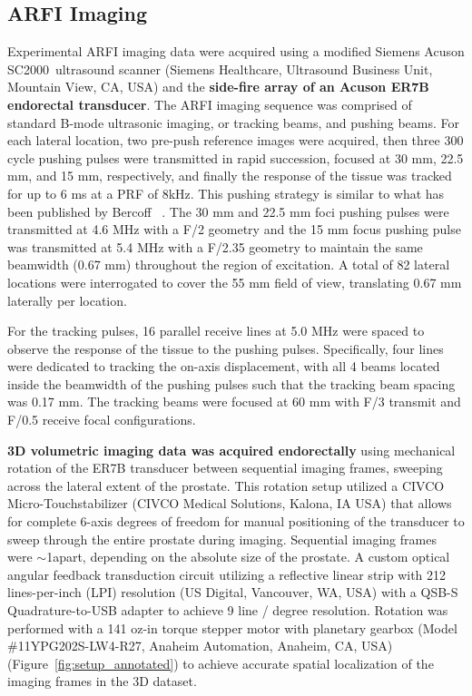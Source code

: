 \subsection{ARFI Imaging}
Experimental ARFI imaging data were acquired using a modified Siemens Acuson
SC2000\texttrademark~ultrasound scanner (Siemens Healthcare, Ultrasound Business Unit,
Mountain View, CA, USA) and the \textbf{side-fire array of an Acuson ER7B
endorectal transducer}.  The ARFI imaging sequence was comprised of
standard B-mode ultrasonic imaging, or tracking beams, and pushing beams. For
each lateral location, two pre-push reference images were acquired, then three
300 cycle pushing pulses were transmitted in rapid succession, focused at 30
mm, 22.5 mm, and 15 mm, respectively, and finally the response of the tissue
was tracked for up to 6 ms at a PRF of 8kHz. This pushing strategy is similar to
what has been published by Bercoff \etal~\cite{Bercoff2004}. The 30 mm and 22.5
mm foci pushing pulses were transmitted at 4.6 MHz with a F/2 geometry and the
15 mm focus pushing pulse was transmitted at 5.4 MHz with a F/2.35 geometry to
maintain the same beamwidth (0.67 mm) throughout the region of excitation. A
total of 82 lateral locations were interrogated to cover the 55 mm field of
view, translating 0.67 mm laterally per location.

For the tracking pulses, 16 parallel receive lines at 5.0 MHz were spaced to
observe the response of the tissue to the pushing pulses.  Specifically, four
lines were dedicated to tracking the on-axis displacement, with all 4 beams
located inside the beamwidth of the pushing pulses such that the tracking beam
spacing was 0.17 mm.  The tracking beams were focused at 60 mm with F/3
transmit and F/0.5 receive focal configurations.

\textbf{3D volumetric imaging data was acquired endorectally} using mechanical
rotation of the ER7B transducer between sequential imaging frames, sweeping
across the lateral extent of the prostate.  This rotation setup utilized a
CIVCO Micro-Touch\texttrademark stabilizer (CIVCO Medical Solutions, Kalona, IA
USA) that allows for complete 6-axis degrees of freedom for manual positioning
of the transducer to sweep through the entire prostate during imaging.
Sequential imaging frames were $\sim$1\degree apart, depending on the absolute
size of the prostate.  A custom optical angular feedback transduction circuit
utilizing a reflective linear strip with 212 lines-per-inch (LPI) resolution
(US Digital, Vancouver, WA, USA) with a QSB-S Quadrature-to-USB adapter to
achieve 9 line / degree resolution.  Rotation was performed with a 141 oz-in
torque stepper motor with planetary gearbox (Model \#11YPG202S-LW4-R27, Anaheim
Automation, Anaheim, CA, USA) (Figure~\ref{fig:setup_annotated}) to achieve
accurate spatial localization of the imaging frames in the 3D dataset.

